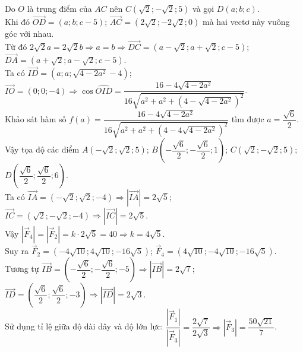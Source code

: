 \begin{ex}
{\begin{center}
        \end{center}
        Do $O$ là trung điểm của $AC$ nên $C(\sqrt{2};-\sqrt{2};5)$ và gọi $D(a;b;c)$.\\
        Khi đó $\overrightarrow{OD} = (a;b;c-5)$; $\overrightarrow{AC} = (2\sqrt{2}; -2\sqrt{2}; 0)$ mà hai vectơ này vuông góc với nhau.\\
        Từ đó $2\sqrt{2}a = 2\sqrt{2}b \Rightarrow a=b \Rightarrow \overrightarrow{DC} = (a-\sqrt{2}; a+\sqrt{2}; c-5)$; $\overrightarrow{DA} = (a+\sqrt{2}; a-\sqrt{2}; c-5)$.\\
        Ta có $\overrightarrow{ID} = (a; a; \sqrt{4-2a^2}-4)$; $\overrightarrow{IO} = (0;0;-4) \Rightarrow \cos \widehat{OID} = \dfrac{16-4\sqrt{4-2a^2}}{16\sqrt{a^2+a^2+(4-\sqrt{4-2a^2})^2}}$.\\
        Khảo sát hàm số $f(a) = \dfrac{16-4\sqrt{4-2a^2}}{16\sqrt{a^2+a^2+(4-4\sqrt{4-2a^2})^2}}$ tìm được $a = \dfrac{\sqrt{6}}{2}$.\\
        Vậy tọa độ các điểm $A(-\sqrt{2};\sqrt{2};5)$; $B\left(-\dfrac{\sqrt{6}}{2};-\dfrac{\sqrt{6}}{2};1\right)$; $C(\sqrt{2};-\sqrt{2};5)$; $D\left(\dfrac{\sqrt{6}}{2};\dfrac{\sqrt{6}}{2};6\right)$.\\
        Ta có $\overrightarrow{IA}=(-\sqrt{2};\sqrt{2};-4) \Rightarrow \left|\overrightarrow{IA}\right|=2\sqrt{5}$; $\overrightarrow{IC}=(\sqrt{2};-\sqrt{2};-4) \Rightarrow \left|\overrightarrow{IC}\right|=2\sqrt{5}$.\\
        Vậy $\left|\overrightarrow{F}_4\right|=\left|\overrightarrow{F}_2\right|=k \cdot 2\sqrt{5} = 40 \Rightarrow k=4\sqrt{5}$.\\
        Suy ra $\overrightarrow{F}_2 = (-4\sqrt{10}; 4\sqrt{10}; -16\sqrt{5})$; $\overrightarrow{F}_4 = (4\sqrt{10}; -4\sqrt{10}; -16\sqrt{5})$.\\
        Tương tự $\overrightarrow{IB}=\left(-\dfrac{\sqrt{6}}{2};-\dfrac{\sqrt{6}}{2};-5\right) \Rightarrow \left|\overrightarrow{IB}\right|=2\sqrt{7}$; $\overrightarrow{ID}=\left(\dfrac{\sqrt{6}}{2};\dfrac{\sqrt{6}}{2};-3\right) \Rightarrow \left|\overrightarrow{ID}\right|=2\sqrt{3}$.\\
        Sử dụng tỉ lệ giữa độ dài dây và độ lớn lực: $\dfrac{\left|\overrightarrow{F}_1\right|}{\left|\overrightarrow{F}_3\right|} = \dfrac{2\sqrt{7}}{2\sqrt{3}} \Rightarrow \left|\overrightarrow{F}_3\right| = \dfrac{50\sqrt{21}}{7}$.\\
}
\end{ex}
